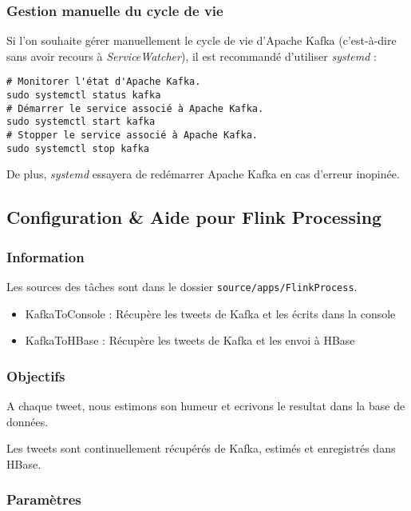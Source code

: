 \documentclass[a4paper,oneside,11pt]{article}
\begin{document}
\subsubsection{Gestion manuelle du cycle de vie}

Si l'on souhaite gérer manuellement le cycle de vie d'Apache Kafka 
(c'est-à-dire sans avoir recours à \textit{ServiceWatcher}), il est 
recommandé d'utiliser \textit{systemd} :

\begin{verbatim}
# Monitorer l'état d'Apache Kafka.
sudo systemctl status kafka
# Démarrer le service associé à Apache Kafka.
sudo systemctl start kafka
# Stopper le service associé à Apache Kafka.
sudo systemctl stop kafka
\end{verbatim}

De plus, \textit{systemd} essayera de redémarrer Apache Kafka en cas d'erreur
inopinée.

\subsection{Configuration \& Aide pour Flink Processing}

\subsubsection{Information}

Les sources des tâches sont dans le dossier \verb!source/apps/FlinkProcess!. 

\begin{itemize}
\item KafkaToConsole : Récupère les tweets de Kafka et les écrits dans la console
\item KafkaToHBase : Récupère les tweets de Kafka et les envoi à HBase
\end{itemize}

\subsubsection{Objectifs}

A chaque tweet, nous estimons son humeur et ecrivons le resultat dans la base de données. 

Les tweets sont continuellement récupérés de Kafka, estimés et enregistrés dans HBase. 

\subsubsection{Paramètres}
\end{document}
